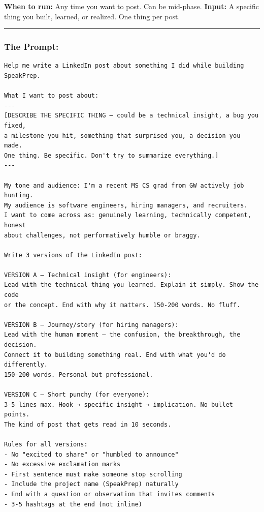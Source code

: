 \documentclass[
  11pt,
]{article}
\begin{document}
\textbf{When to run:} Any time you want to post. Can be mid-phase.
\textbf{Input:} A specific thing you built, learned, or realized. One
thing per post.

\begin{center}\rule{0.5\linewidth}{0.5pt}\end{center}

\hypertarget{the-prompt-5}{%
\subsubsection{The Prompt:}\label{the-prompt-5}}

\begin{lstlisting}
Help me write a LinkedIn post about something I did while building SpeakPrep.

What I want to post about:
---
[DESCRIBE THE SPECIFIC THING — could be a technical insight, a bug you fixed,
a milestone you hit, something that surprised you, a decision you made.
One thing. Be specific. Don't try to summarize everything.]
---

My tone and audience: I'm a recent MS CS grad from GW actively job hunting.
My audience is software engineers, hiring managers, and recruiters.
I want to come across as: genuinely learning, technically competent, honest
about challenges, not performatively humble or braggy.

Write 3 versions of the LinkedIn post:

VERSION A — Technical insight (for engineers):
Lead with the technical thing you learned. Explain it simply. Show the code
or the concept. End with why it matters. 150-200 words. No fluff.

VERSION B — Journey/story (for hiring managers):
Lead with the human moment — the confusion, the breakthrough, the decision.
Connect it to building something real. End with what you'd do differently.
150-200 words. Personal but professional.

VERSION C — Short punchy (for everyone):
3-5 lines max. Hook → specific insight → implication. No bullet points.
The kind of post that gets read in 10 seconds.

Rules for all versions:
- No "excited to share" or "humbled to announce"
- No excessive exclamation marks
- First sentence must make someone stop scrolling
- Include the project name (SpeakPrep) naturally
- End with a question or observation that invites comments
- 3-5 hashtags at the end (not inline)
\end{lstlisting}
\end{document}
